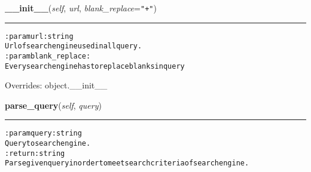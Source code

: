     \vspace{0.5ex}

\hspace{.8\funcindent}\begin{boxedminipage}{\funcwidth}

    \raggedright \textbf{\_\_init\_\_}(\textit{self}, \textit{url}, \textit{blank\_replace}={\tt "+"})

    \vspace{-1.5ex}

    \rule{\textwidth}{0.5\fboxrule}
\setlength{\parskip}{2ex}
\begin{alltt}

:param url: string
    Url of search engine used in all query.
:param blank\_replace:
    Every search engine has to replace blanks in query
\end{alltt}

\setlength{\parskip}{1ex}
      Overrides: object.\_\_init\_\_

    \end{boxedminipage}

    \label{hal:internet:engines:SearchEngine:parse_query}

    \vspace{0.5ex}

\hspace{.8\funcindent}\begin{boxedminipage}{\funcwidth}

    \raggedright \textbf{parse\_query}(\textit{self}, \textit{query})

    \vspace{-1.5ex}

    \rule{\textwidth}{0.5\fboxrule}
\setlength{\parskip}{2ex}
\begin{alltt}

:param query: string
    Query to search engine.
:return: string
    Parse given query in order to meet search criteria of search engine.
\end{alltt}

\setlength{\parskip}{1ex}
    \end{boxedminipage}

    \label{hal:internet:engines:SearchEngine:get_search_page}


